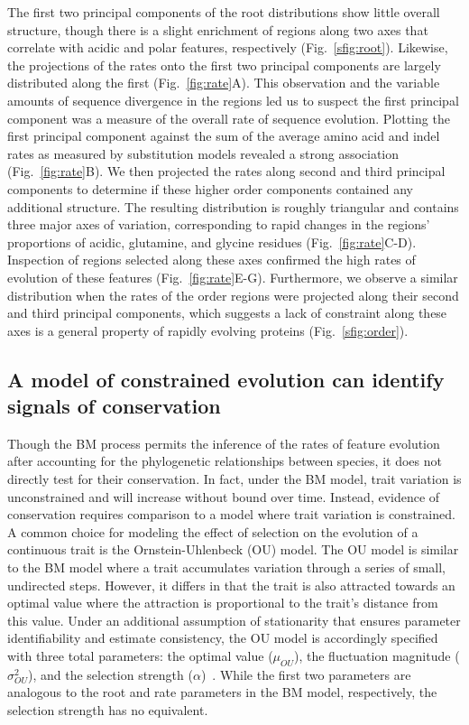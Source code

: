 The first two principal components of the root distributions show little overall structure, though there is a slight enrichment of regions along two axes that correlate with acidic and polar features, respectively (Fig.~\ref{sfig:root}). Likewise, the projections of the rates onto the first two principal components are largely distributed along the first (Fig.~\ref{fig:rate}A). This observation and the variable amounts of sequence divergence in the regions led us to suspect the first principal component was a measure of the overall rate of sequence evolution. Plotting the first principal component against the sum of the average amino acid and indel rates as measured by substitution models revealed a strong association (Fig.~\ref{fig:rate}B). We then projected the rates along second and third principal components to determine if these higher order components contained any additional structure. The resulting distribution is roughly triangular and contains three major axes of variation, corresponding to rapid changes in the regions' proportions of acidic, glutamine, and glycine residues (Fig.~\ref{fig:rate}C-D). Inspection of regions selected along these axes confirmed the high rates of evolution of these features (Fig.~\ref{fig:rate}E-G). Furthermore, we observe a similar distribution when the rates of the order regions were projected along their second and third principal components, which suggests a lack of constraint along these axes is a general property of rapidly evolving proteins (Fig.~\ref{sfig:order}).

\subsection{A model of constrained evolution can identify signals of conservation}
Though the BM process permits the inference of the rates of feature evolution after accounting for the phylogenetic relationships between species, it does not directly test for their conservation. In fact, under the BM model, trait variation is unconstrained and will increase without bound over time. Instead, evidence of conservation requires comparison to a model where trait variation is constrained. A common choice for modeling the effect of selection on the evolution of a continuous trait is the Ornstein-Uhlenbeck (OU) model. The OU model is similar to the BM model where a trait accumulates variation through a series of small, undirected steps. However, it differs in that the trait is also attracted towards an optimal value where the attraction is proportional to the trait's distance from this value. Under an additional assumption of stationarity that ensures parameter identifiability and estimate consistency, the OU model is accordingly specified with three total parameters: the optimal value ($\mu_{OU}$), the fluctuation magnitude ($\sigma^2_{OU}$), and the selection strength ($\alpha$)~\cite{Ho2013, Ho2014}. While the first two parameters are analogous to the root and rate parameters in the BM model, respectively, the selection strength has no equivalent.

